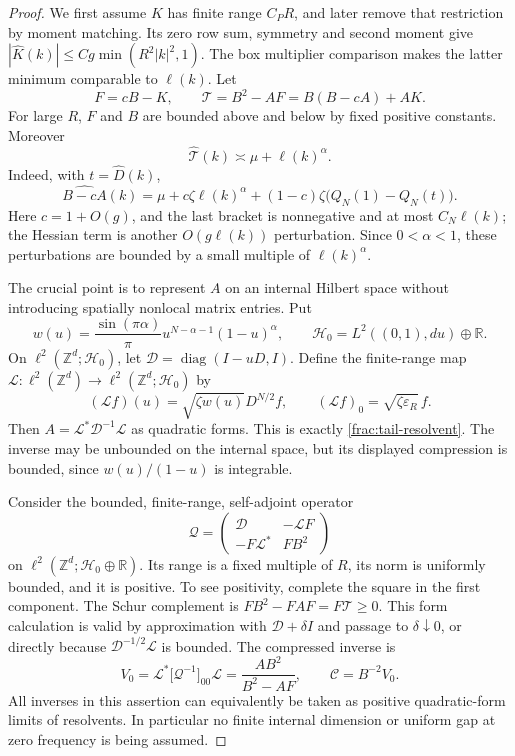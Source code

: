 \documentclass[11pt]{article}
\begin{document}
\begin{proof}
We first assume \(K\) has finite range \(C_PR\), and later remove
that restriction by moment matching. Its zero row sum, symmetry and
second moment give \(|\widehat K(k)|\le Cg\min(R^2|k|^2,1)\).
The box multiplier comparison makes the latter minimum comparable
to \(\ell(k)\). Let
\[
 F=cB-K,\qquad \mathscr T=B^2-AF=B(B-cA)+AK.
\]
For large \(R\), \(F\) and \(B\) are bounded above and below by
fixed positive constants. Moreover
\begin{equation}\label{complete:den-comparison}
 \widehat{\mathscr T}(k)\asymp \mu+\ell(k)^\alpha.
\end{equation}
Indeed, with \(t=\widehat D(k)\),
\[
 \widehat{B-cA}(k)
 =\mu+c\zeta\ell(k)^\alpha
       +(1-c)\zeta\bigl(Q_N(1)-Q_N(t)\bigr).
\]
Here \(c=1+O(g)\), and the last bracket is nonnegative and at most
\(C_N\ell(k)\); the Hessian term is another \(O(g\ell(k))\)
perturbation. Since \(0<\alpha<1\), these perturbations are bounded
by a small multiple of \(\ell(k)^\alpha\).

The crucial point is to represent \(A\) on an internal Hilbert space
without introducing spatially nonlocal matrix entries. Put
\[
 w(u)=\frac{\sin(\pi\alpha)}\pi
                 u^{N-\alpha-1}(1-u)^\alpha,
 \qquad \mathcal H_0=L^2((0,1),du)\oplus\mathbb R.
\]
On \(\ell^2(\mathbb Z^d;\mathcal H_0)\), let
\(\mathcal D=\operatorname{diag}(I-uD,I)\). Define the finite-range
map \(\mathcal L:\ell^2(\mathbb Z^d)\to
\ell^2(\mathbb Z^d;\mathcal H_0)\) by
\[
 (\mathcal L f)(u)=\sqrt{\zeta w(u)}D^{N/2}f,
 \qquad (\mathcal L f)_0=\sqrt{\zeta\varepsilon_R}\,f.
\]
Then \(A=\mathcal L^*\mathcal D^{-1}\mathcal L\) as quadratic
forms. This is exactly \eqref{frac:tail-resolvent}. The inverse may
be unbounded on the internal space, but its displayed compression
is bounded, since \(w(u)/(1-u)\) is integrable.

Consider the bounded, finite-range, self-adjoint operator
\begin{equation}\label{complete:block-operator}
 \mathcal Q=
 \begin{pmatrix}
   \mathcal D&-\mathcal L F\\
   -F\mathcal L^*&FB^2
 \end{pmatrix}
\end{equation}
on \(\ell^2(\mathbb Z^d;\mathcal H_0\oplus\mathbb R)\).
Its range is a fixed multiple of \(R\), its norm is uniformly
bounded, and it is positive. To see positivity, complete the square
in the first component. The Schur complement is
\(FB^2-F A F=F\mathscr T\ge0\). This form calculation is valid
by approximation with \(\mathcal D+\delta I\) and passage to
\(\delta\downarrow0\), or directly because
\(\mathcal D^{-1/2}\mathcal L\) is bounded. The compressed inverse is
\begin{equation}\label{complete:block-compression}
 V_0=\mathcal L^*\bigl[\mathcal Q^{-1}\bigr]_{00}\mathcal L
       =\frac{AB^2}{B^2-AF},\qquad
 \mathscr C=B^{-2}V_0.
\end{equation}
All inverses in this assertion can equivalently be taken as positive
quadratic-form limits of resolvents. In particular no finite internal
dimension or uniform gap at zero frequency is being assumed.


\end{proof}
\end{document}
